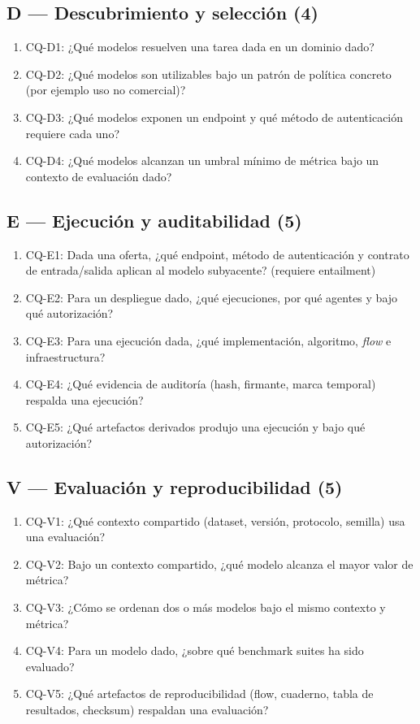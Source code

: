 \documentclass[Afour,sagev,times]{sagej}
\newcommand{\cq}[1]{\textsf{#1}}
\begin{document}
\subsection*{D --- Descubrimiento y selección (4)}
\begin{enumerate}[label=\arabic*., leftmargin=*]
\item \cq{CQ-D1}: ¿Qué modelos resuelven una tarea dada en un dominio dado?
\item \cq{CQ-D2}: ¿Qué modelos son utilizables bajo un patrón de política concreto (por ejemplo uso no comercial)?
\item \cq{CQ-D3}: ¿Qué modelos exponen un endpoint y qué método de autenticación requiere cada uno?
\item \cq{CQ-D4}: ¿Qué modelos alcanzan un umbral mínimo de métrica bajo un contexto de evaluación dado?
\end{enumerate}

\subsection*{E --- Ejecución y auditabilidad (5)}
\begin{enumerate}[label=\arabic*., leftmargin=*]
\item \cq{CQ-E1}: Dada una oferta, ¿qué endpoint, método de autenticación y contrato de entrada/salida aplican al modelo subyacente? (requiere entailment)
\item \cq{CQ-E2}: Para un despliegue dado, ¿qué ejecuciones, por qué agentes y bajo qué autorización?
\item \cq{CQ-E3}: Para una ejecución dada, ¿qué implementación, algoritmo, \emph{flow} e infraestructura?
\item \cq{CQ-E4}: ¿Qué evidencia de auditoría (hash, firmante, marca temporal) respalda una ejecución?
\item \cq{CQ-E5}: ¿Qué artefactos derivados produjo una ejecución y bajo qué autorización?
\end{enumerate}

\subsection*{V --- Evaluación y reproducibilidad (5)}
\begin{enumerate}[label=\arabic*., leftmargin=*]
\item \cq{CQ-V1}: ¿Qué contexto compartido (dataset, versión, protocolo, semilla) usa una evaluación?
\item \cq{CQ-V2}: Bajo un contexto compartido, ¿qué modelo alcanza el mayor valor de métrica?
\item \cq{CQ-V3}: ¿Cómo se ordenan dos o más modelos bajo el mismo contexto y métrica?
\item \cq{CQ-V4}: Para un modelo dado, ¿sobre qué benchmark suites ha sido evaluado?
\item \cq{CQ-V5}: ¿Qué artefactos de reproducibilidad (flow, cuaderno, tabla de resultados, checksum) respaldan una evaluación?
\end{enumerate}
\end{document}
